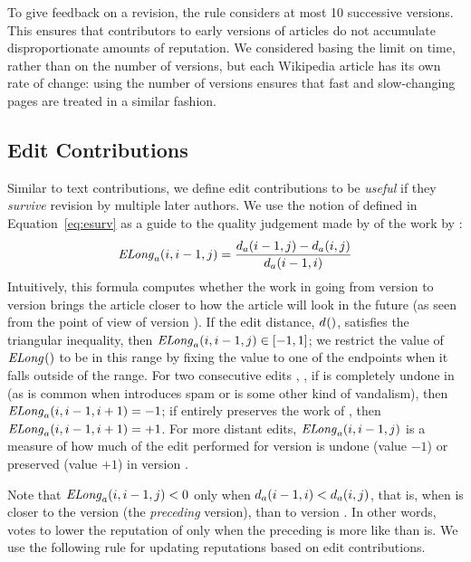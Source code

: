 To give feedback on a revision, the rule considers at most 10
successive versions. 
This ensures that contributors to early versions of articles do not
accumulate disproportionate amounts of reputation. 
We considered basing the limit on time, rather than on the number of
versions, but each Wikipedia article has its own rate of change:
using the number of versions ensures that fast and
slow-changing pages are treated in a similar fashion.

\subsection{Edit Contributions}

Similar to text contributions, we define edit contributions to
be \textit{useful} if they \textit{survive} revision by multiple
later authors.
We use the notion of  defined in
Equation~\ref{eq:esurv} as a guide to the quality judgement
made by  of the work by :
\begin{equation*}
\mathit{ELong}_{a}(i,i-1,j) = \frac{d_{a}(i-1,j) - d_{a}(i,j)}
                        {d_{a}(i-1,i)}
\end{equation*}
Intuitively, this formula computes whether the work in going
from version  to version  brings the
article closer to how the article will look in the future
(as seen from the point of view of version ).
If the edit distance, $d_{}()$,
satisfies the triangular inequality,
then $\mathit{ELong}_{a}(i,i-1,j) \in [-1,1]$;  
we restrict the value of $\mathit{ELong}_{}()$ to be in this
range by fixing the value to one of the endpoints when
it falls outside of the range.
For two consecutive edits , ,
if  is completely undone in 
(as is common when  introduces spam or is some other
kind of vandalism), then $\mathit{ELong}_{a}(i,i-1,i+1) = -1$; 
if  entirely preserves the work of ,
then $\mathit{ELong}_{a}(i,i-1,i+1) = +1$.
For more distant edits, $\mathit{ELong}_{a}(i,i-1,j)$ is a measure of how much of the
edit performed for version 
is undone (value $-1$) or preserved (value $+1$) in version . 

Note that $\mathit{ELong}_{a}(i,i-1,j) < 0$
only when
$d_{a}(i-1,i) < d_{a}(i,j)$,
that is,
when  is closer to the version 
(the \textit{preceding} version), than to version .
In other words, 
votes to lower the reputation of 
only when the preceding  is more like 
than  is.
We use the following rule for updating reputations based on
edit contributions.

